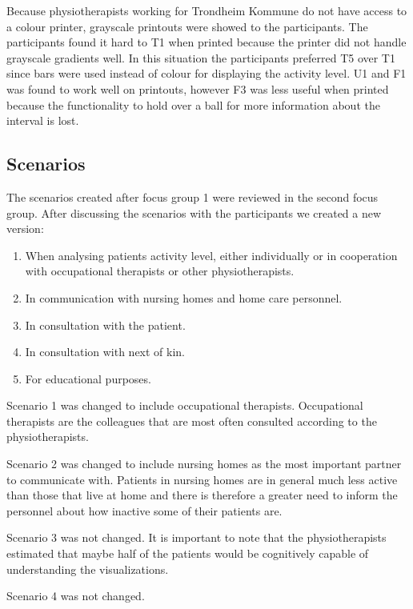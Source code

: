 Because physiotherapists working for Trondheim Kommune do not have access to a colour printer, grayscale printouts were showed to the participants. The participants found it hard to T1 when printed because the printer did not handle grayscale gradients well. In this situation the participants preferred T5 over T1 since bars were used instead of colour for displaying the activity level. U1 and F1 was found to work well on printouts, however F3 was less useful when printed because the functionality to hold over a ball for more information about the interval is lost.

\subsection{Scenarios}
The scenarios created after focus group 1 were reviewed in the second focus group. After discussing the scenarios with the participants we created a new version:
\vspace{-6mm}
\begin{enumerate}[itemsep=0cm, parsep=0cm]
\item When analysing patients activity level, either individually or in cooperation with occupational therapists or other physiotherapists.
\item In communication with nursing homes and home care personnel.
\item In consultation with the patient.
\item In consultation with next of kin.
\item For educational purposes.
\end{enumerate}

Scenario 1 was changed to include occupational therapists. Occupational therapists are the colleagues that are most often consulted according to the physiotherapists. 

Scenario 2 was changed to include nursing homes as the most important partner to communicate with. Patients in nursing homes are in general much less active than those that live at home and there is therefore a greater need to inform the personnel about how inactive some of their patients are.

Scenario 3 was not changed. It is important to note that the physiotherapists estimated that maybe half of the patients would be cognitively capable of understanding the visualizations.

Scenario 4 was not changed.

